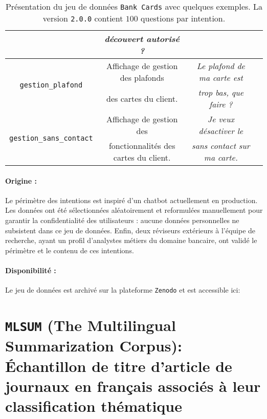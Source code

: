 \begin{table}[!htb]
\begin{center}
\begin{scriptsize}
\begin{tabular}{|c|c|c|c|}
				& \textit{découvert autorisé ?}
				\tabularnewline
				\hline
			\multirow{2}{*}{\texttt{gestion\_plafond}}
				& Affichage de gestion des plafonds
				& \textit{Le plafond de ma carte est}
				\tabularnewline
				& des cartes du client.
				& \textit{trop bas, que faire ?}
				\tabularnewline
				\hline
			\multirow{2}{*}{\texttt{gestion\_sans\_contact}}
				& Affichage de gestion des
				& \textit{Je veux désactiver le}
				\tabularnewline
				& fonctionnalités des cartes du client.
				& \textit{sans contact sur ma carte.}
				\tabularnewline
				\hline
		\end{tabular}
		\end{scriptsize}
		\end{center}
		\caption{
			Présentation du jeu de données \texttt{Bank Cards} avec quelques exemples.
			La version \texttt{2.0.0} contient $100$ questions par intention.
		}
		\label{table:A.1-DATASET-BANK-CARDS}
	\end{table}
	
	\paragraph{Origine :}
	Le périmètre des intentions est inspiré d'un chatbot actuellement en production.
	Les données ont été sélectionnées aléatoirement et reformulées manuellement pour garantir la confidentialité des utilisateurs : aucune données personnelles ne subsistent dans ce jeu de données.
	Enfin, deux réviseurs extérieurs à l'équipe de recherche, ayant un profil d'analystes métiers du domaine bancaire, ont validé le périmètre et le contenu de ces intentions.
	
	\paragraph{Disponibilité :}
	Le jeu de données est archivé sur la plateforme \texttt{Zenodo} et est accessible ici: \cite{schild:2022:french-trainset-chatbots}


\section{\texttt{MLSUM} (The Multilingual Summarization Corpus): Échantillon de titre d'article de journaux en français associés à leur classification thématique}
\label{annex:A.2-DATASET-MLSUM-SUBSET-SCHILD}
	
